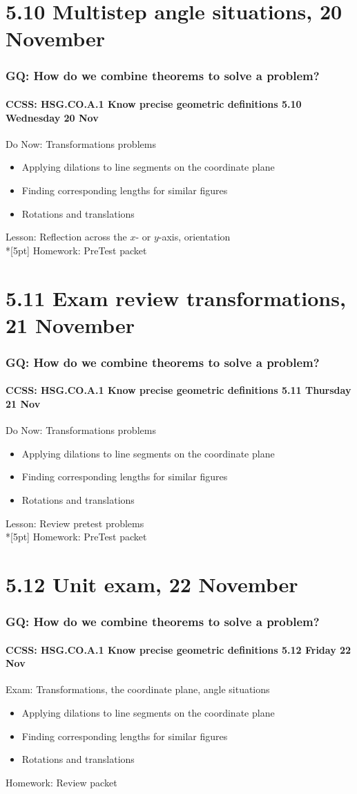 \documentclass{beamer}
\begin{document}
\section{5.10 Multistep angle situations, 20 November}
\frame
{
  \frametitle{GQ: How do we combine theorems to solve a problem?}
  \framesubtitle{CCSS: HSG.CO.A.1 Know precise geometric definitions \hfill \alert{5.10 Wednesday 20 Nov}}

  \begin{block}{Do Now: Transformations problems}
  \begin{itemize}
    \item Applying dilations to line segments on the coordinate plane
    \item Finding corresponding lengths for similar figures
    \item Rotations and translations
  \end{itemize}
  \end{block}
  Lesson: Reflection across the $x$- or $y$-axis, orientation\\*[5pt]
  Homework: PreTest packet 
}

\section{5.11 Exam review transformations, 21 November}
\frame
{
  \frametitle{GQ: How do we combine theorems to solve a problem?}
  \framesubtitle{CCSS: HSG.CO.A.1 Know precise geometric definitions \hfill \alert{5.11 Thursday 21 Nov}}

  \begin{block}{Do Now: Transformations problems}
  \begin{itemize}
    \item Applying dilations to line segments on the coordinate plane
    \item Finding corresponding lengths for similar figures
    \item Rotations and translations
  \end{itemize}
  \end{block}
  Lesson: Review pretest problems\\*[5pt]
  Homework: PreTest packet 
}

\section{5.12 Unit exam, 22 November}
\frame
{
  \frametitle{GQ: How do we combine theorems to solve a problem?}
  \framesubtitle{CCSS: HSG.CO.A.1 Know precise geometric definitions \hfill \alert{5.12 Friday 22 Nov}}

  \begin{block}{Exam: Transformations, the coordinate plane, angle situations}
  \begin{itemize}
    \item Applying dilations to line segments on the coordinate plane
    \item Finding corresponding lengths for similar figures
    \item Rotations and translations
  \end{itemize}
  \end{block}
  Homework: Review packet 
}
\end{document}
